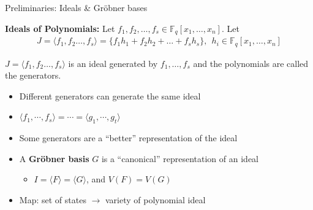 \documentclass[xcolor=dvipsnames]{beamer}
\newcommand{\Fq}{{\mathbb{F}}_{q}}
\newcommand{\bi}{\begin{itemize}}
\newcommand{\ei}{\end{itemize}}
\begin{document}
\begin{frame}{\large{Preliminaries: Ideals \& Gr\"obner bases}}
\vspace{-0.1in}


\begin{Definition}
{\bf Ideals of Polynomials:} Let $f_1, f_2, \ldots, f_s \in
\mathbb{F}_q[x_1, \dots, x_n]$. Let 
\begin{eqnarray}
J = \langle f_1, f_2 \ldots, f_s\rangle = \{f_1 h_1 + f_2 h_2 + \dots + f_s h_s\},~~h_i\in\Fq[x_1,\dots,x_n] \nonumber 
\end{eqnarray}

$J = \langle f_1, f_2 \ldots, f_s\rangle$ is an ideal generated by
$f_1, \ldots, f_s$ and the polynomials are called the generators. 
\end{Definition}

\vspace{-0.1in}

\begin{itemize}
\item Different generators can generate the same ideal
\item $\langle f_1,\cdots,f_s \rangle=\cdots=\langle g_1,\cdots,g_t
  \rangle$
\item Some generators are a ``better'' representation of the ideal
\item A {\bf Gr\"obner basis} $G$ is a ``canonical'' representation of an ideal
	\bi
	\item $I = \langle F \rangle = \langle G \rangle$, and $V(F)=V(G)$
	\ei
\item Map: set of states $\to$ \alert{variety} of polynomial ideal
\end{itemize}
\end{frame}
\end{document}
